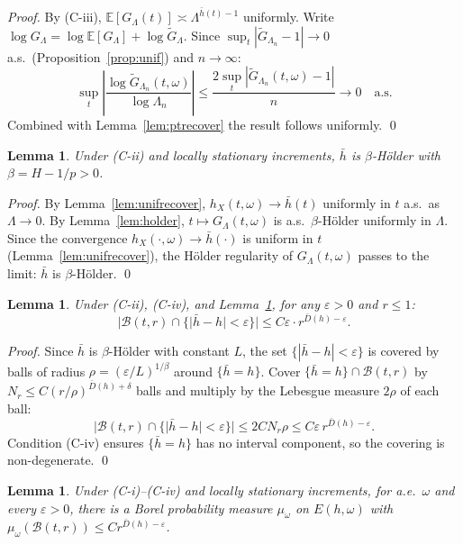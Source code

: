\documentclass[11pt,a4paper]{article}
\newtheorem{lemma}[theorem]{Lemma}
\theoremstyle{definition}
\theoremstyle{remark}
\newcommand{\E}{\mathbb{E}}
\newcommand{\GL}{G_\Lambda}
\newcommand{\hb}{\bar{h}}
\begin{document}
\begin{proof}
By (C-iii), $\E[\GL(t)]\asymp\Lambda^{\hb(t)-1}$ uniformly. Write
$\log\GL=\log\E[\GL]+\log\tilde G_\Lambda$. Since
$\sup_t|\tilde G_{\Lambda_n}-1|\to0$ a.s.\ (Proposition~\ref{prop:unif})
and $n\to\infty$:
\[
  \sup_t\left|\frac{\log\tilde G_{\Lambda_n}(t,\omega)}{\log\Lambda_n}\right|
  \le\frac{2\sup_t|\tilde G_{\Lambda_n}(t,\omega)-1|}{n}\to0\quad\text{a.s.}
\]
Combined with Lemma~\ref{lem:ptrecover} the result follows uniformly. \qed
\end{proof}

\begin{lemma}\label{lem:hbarholder}
Under (C-ii) and locally stationary increments, $\hb$ is
$\beta$-H\"{o}lder with $\beta=H-1/p>0$.
\end{lemma}

\begin{proof}
By Lemma~\ref{lem:unifrecover}, $h_X(t,\omega)\to\hb(t)$ uniformly
in $t$ a.s.\ as $\Lambda\to0$. By Lemma~\ref{lem:holder},
$t\mapsto\GL(t,\omega)$ is a.s.\ $\beta$-H\"{o}lder uniformly in
$\Lambda$. Since the convergence $h_X(\cdot,\omega)\to\hb(\cdot)$
is uniform in $t$ (Lemma~\ref{lem:unifrecover}), the H\"{o}lder
regularity of $\GL(t,\omega)$ passes to the limit: $\hb$ is
$\beta$-H\"{o}lder. \qed
\end{proof}

\begin{lemma}\label{lem:ballbound}
Under (C-ii), (C-iv), and Lemma~\ref{lem:hbarholder}, for any
$\varepsilon>0$ and $r\le1$:
\[
  |\mathcal{B}(t,r)\cap\{|\hb-h|<\varepsilon\}|
  \le C\varepsilon\cdot r^{\bar D(h)-\varepsilon}.
\]
\end{lemma}

\begin{proof}
Since $\hb$ is $\beta$-H\"{o}lder with constant $L$, the set
$\{|\hb-h|<\varepsilon\}$ is covered by balls of radius
$\rho=(\varepsilon/L)^{1/\beta}$ around $\{\hb=h\}$. Cover
$\{\hb=h\}\cap\mathcal{B}(t,r)$ by
$N_r\le C(r/\rho)^{\bar D(h)+\delta}$ balls and multiply by the
Lebesgue measure $2\rho$ of each ball:
\[
  |\mathcal{B}(t,r)\cap\{|\hb-h|<\varepsilon\}|
  \le 2CN_r\rho
  \le C\varepsilon\,r^{\bar D(h)-\varepsilon}.
\]
Condition (C-iv) ensures $\{\hb=h\}$ has no interval component,
so the covering is non-degenerate. \qed
\end{proof}

\begin{lemma}\label{lem:frostman}
Under (C-i)--(C-iv) and locally stationary increments, for a.e.\
$\omega$ and every $\varepsilon>0$, there is a Borel probability
measure $\mu_\omega$ on $E(h,\omega)$ with
$\mu_\omega(\mathcal{B}(t,r))\le Cr^{\bar D(h)-\varepsilon}$.
\end{lemma}
\end{document}
